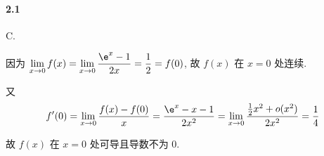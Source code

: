 \paragraph*{2.1} C.

因为 $\lim\limits_{x\to 0}f(x)=\lim\limits_{x\to 0}\dfrac{\e^x-1}{2x}=\dfrac{1}{2}=f(0)$, 故 $f(x)$ 在 $x=0$ 处连续.

又 
\[
	f'(0)=\lim_{x\to 0}\dfrac{f(x)-f(0)}{x}=\dfrac{\e^x-x-1}{2x^2}=\lim_{x\to 0}\dfrac{\frac{1}{2}x^2+o(x^2)}{2x^2}=\dfrac{1}{4}
\] 

故 $f(x)$ 在 $x=0$ 处可导且导数不为 $0$.